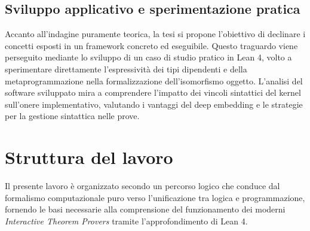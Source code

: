 \subsection{Sviluppo applicativo e sperimentazione pratica}
Accanto all'indagine puramente teorica, la tesi si propone l'obiettivo di declinare i concetti esposti in un framework concreto ed eseguibile. Questo 
traguardo viene perseguito mediante lo sviluppo di un caso di studio pratico in Lean 4, volto a sperimentare direttamente l'espressività dei tipi 
dipendenti e della metaprogrammazione nella formalizzazione dell'isomorfismo oggetto. L'analisi del software sviluppato mira a comprendere l'impatto 
dei vincoli sintattici del kernel sull'onere implementativo, valutando i vantaggi del deep embedding e le strategie per la gestione sintattica nelle prove.

\section{Struttura del lavoro}
Il presente lavoro è organizzato secondo un percorso logico che conduce dal formalismo computazionale puro verso l'unificazione tra logica 
e programmazione, fornendo le basi necessarie alla comprensione del funzionamento dei moderni \textit{Interactive Theorem Provers} tramite 
l'approfondimento di Lean 4.

